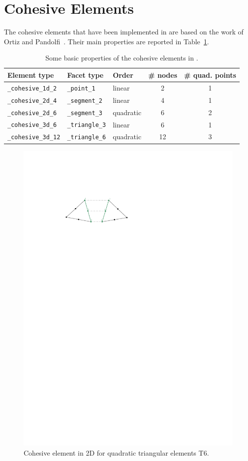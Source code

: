 
\section{Cohesive Elements}

The cohesive elements that have been implemented in \akantu are based
on the work of Ortiz and Pandolfi~\cite{ortiz1999}. Their main
properties are reported in Table~\ref{tab:coh:cohesive_elements}.

\begin{table}[!htb]
\begin{center}
\begin{tabular}{l|llcc}
\toprule
Element type & Facet type & Order & \# nodes & \# quad. points  \\
\midrule
\texttt{\_cohesive\_1d\_2} & \texttt{\_point\_1} & linear & 2 & 1  \\
\hline
\texttt{\_cohesive\_2d\_4} & \texttt{\_segment\_2} & linear & 4 & 1  \\
\texttt{\_cohesive\_2d\_6} & \texttt{\_segment\_3} & quadratic & 6 & 2  \\
\hline
\texttt{\_cohesive\_3d\_6} & \texttt{\_triangle\_3} & linear & 6 & 1  \\
\texttt{\_cohesive\_3d\_12} & \texttt{\_triangle\_6} & quadratic & 12 & 3  \\
\bottomrule
\end{tabular}
\end{center}
\caption{Some basic properties of the cohesive elements in \akantu.}
\label{tab:coh:cohesive_elements}
\end{table}

\begin{figure}
  \centering
  \includegraphics[width=.6\textwidth]{figures/cohesive2d}
  \caption{Cohesive element in 2D for quadratic triangular elements
    T6.}
  \label{fig:smm:coh:cohesive2d}
\end{figure}

